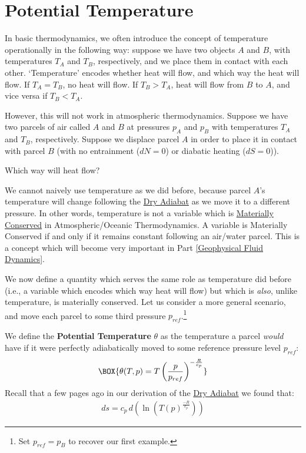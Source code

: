 \section{Potential Temperature}

In basic thermodynamics, we often introduce the concept of temperature operationally in the following way: suppose we have two objects \(A\) and \(B\), with temperatures \(T_A\) and \(T_B\), respectively, and we place them in contact with each other. `Temperature' encodes whether heat will flow, and which way the heat will flow. If \(T_A=T_B\), no heat will flow. If \(T_B>T_A\), heat will flow from \(B\) to \(A\), and vice versa if \(T_B<T_A\).

However, this will not work in atmospheric thermodynamics. Suppose we have two parcels of air called \(A\) and \(B\) at pressures \(p_A\) and \(p_B\) with temperatures \(T_A\) and \(T_B\), respectively. Suppose we displace parcel \(A\) in order to place it in contact with parcel \(B\) (with no entrainment (\(dN=0\)) or diabatic heating (\(dS=0\))).\vspace{4mm}

Which way will heat flow?\vspace{4mm}

We cannot naively use temperature as we did before, because parcel \(A\)'s temperature will change following the \hyperref[Dry Adiabat]{Dry Adiabat} as we move it to a different pressure. In other words, temperature is not a variable which is \hyperref[Material Conservation]{Materially Conserved} in Atmospheric/Oceanic Thermodynamics. A variable is Materially Conserved if and only if it remains constant following an air/water parcel. This is a concept which will become very important in Part \ref{Geophysical Fluid Dynamics}.

We now define a quantity which serves the same role as temperature did before (i.e., a variable which encodes which way heat will flow) but which is \textit{also}, unlike temperature, is materially conserved. Let us consider a more general scenario, and move each parcel to some third pressure \(p_{ref}\).\footnote{Set \(p_{ref}=p_B\) to recover our first example.}

We define the \textbf{Potential Temperature} \(\theta\) as the temperature a parcel \textit{would} have if it were perfectly adiabatically moved to some reference pressure level \(p_{ref}\):
\begin{align}\label{eq Potential Temperature}
    \BOX{\theta(T,p)=T\left(\frac{p}{p_{ref}}\right)^{-\frac{R}{c_p}}}
\end{align}
Recall that a few pages ago in our derivation of the \hyperref[Dry Adiabat]{Dry Adiabat} we found that:
\begin{align}
    \label{eq ds Dry Adiabat}
    ds=c_p\,d\left(\ln \left(T(p)^\frac{-R}{c_p}\right)\right)
\end{align}

